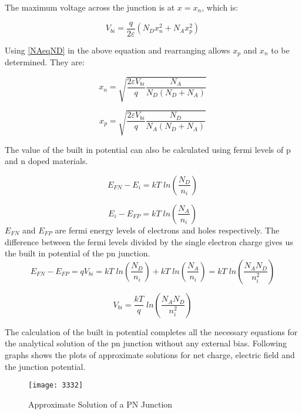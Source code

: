 \begin{doublespace}
The maximum voltage across the junction is at  $x= x_{n}$, which is:

\begin{equation}
V_{bi}=\frac{q}{2\varepsilon}(N_{D}x_{n}^2+N_{A}x_{p}^2)
\end{equation}

Using \eqref{NAeqND} in the above equation and rearranging allows $x_{p}$ and $x_{n}$ to be determined. They are:

\begin{equation}
x_{n}=\sqrt{\frac{2\varepsilon V_{bi}}{q}\frac{N_{A}}{N_{D}(N_{D}+N_{A})}}
\end{equation}

\begin{equation}
x_{p}=\sqrt{\frac{2\varepsilon V_{bi}}{q}\frac{N_{D}}{N_{A}(N_{D}+N_{A})}}
\end{equation}

The value of the built in potential can also be calculated using fermi levels of p and n doped materials.

\begin{equation}
E_{FN}-E_{i}=kT \; ln(\frac{N_{D}}{n_i})
\end{equation}

\begin{equation}
E_{i}-E_{FP}=kT \; ln(\frac{N_{A}}{n_i})
\end{equation}
$E_{FN}$ and $E_{FP}$ are fermi energy levels of electrons and holes respectively. The difference between the fermi levels divided by the single electron charge gives us the built in potential of the pn junction.
\begin{equation}
E_{FN}-E_{FP}=q V_{bi}=kT \; ln(\frac{N_{D}}{n_i})+kT \; ln(\frac{N_{A}}{n_i})=kT \; ln(\frac{N_{A}N_{D}}{n_i^2})
\end{equation}

\begin{equation}
V_{bi}=\frac{kT}{q} \; ln(\frac{N_{A}N_{D}}{n_i^2})
\end{equation}

The calculation of the built in potential completes all the necessary equations for the analytical solution of the pn junction without any external bias. Following graphs shows the plots of approximate solutions for net charge, electric field and the junction potential.

\begin{figure}
\centering
\texttt{[image: 3332]}
\caption{Approximate Solution of a PN Junction} 
\end{figure}

\end{doublespace}

